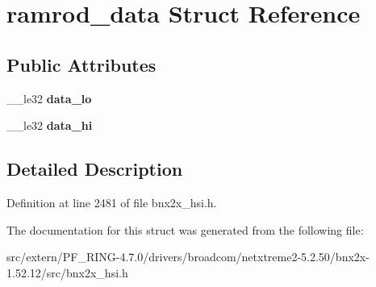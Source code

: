 \hypertarget{structramrod__data}{
\section{ramrod\_\-data Struct Reference}
\label{structramrod__data}
}
\subsection*{Public Attributes}
\begin{DoxyCompactItemize}
\item 
\hypertarget{structramrod__data_af432d083ea8ddd70d5d9dea1d57e2a13}{
\_\-\_\-le32 {\bfseries data\_\-lo}}
\label{structramrod__data_af432d083ea8ddd70d5d9dea1d57e2a13}

\item 
\hypertarget{structramrod__data_ad15e6adbc532b89686a9f01d3bef2bab}{
\_\-\_\-le32 {\bfseries data\_\-hi}}
\label{structramrod__data_ad15e6adbc532b89686a9f01d3bef2bab}

\end{DoxyCompactItemize}


\subsection{Detailed Description}


Definition at line 2481 of file bnx2x\_\-hsi.h.



The documentation for this struct was generated from the following file:\begin{DoxyCompactItemize}
\item 
src/extern/PF\_\-RING-\/4.7.0/drivers/broadcom/netxtreme2-\/5.2.50/bnx2x-\/1.52.12/src/bnx2x\_\-hsi.h\end{DoxyCompactItemize}
